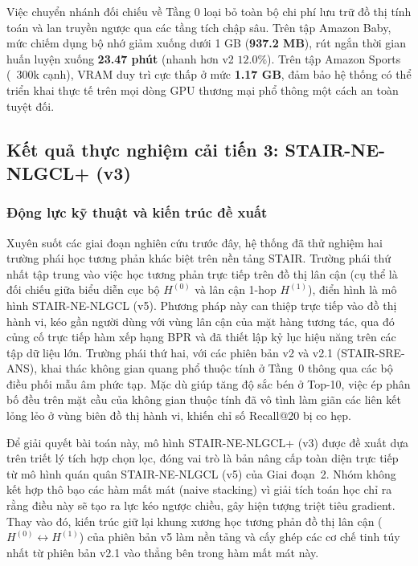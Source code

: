 Việc chuyển nhánh đối chiếu về Tầng 0 loại bỏ toàn bộ chi phí lưu trữ đồ thị tính toán và lan truyền ngược qua các tầng tích chập sâu. Trên tập Amazon Baby, mức chiếm dụng bộ nhớ giảm xuống dưới 1 GB (\textbf{937.2 MB}), rút ngắn thời gian huấn luyện xuống \textbf{23.47 phút} (nhanh hơn v2 $12.0\%$). Trên tập Amazon Sports (~300k cạnh), VRAM duy trì cực thấp ở mức \textbf{1.17 GB}, đảm bảo hệ thống có thể triển khai thực tế trên mọi dòng GPU thương mại phổ thông một cách an toàn tuyệt đối.

\subsection{Kết quả thực nghiệm cải tiến 3: STAIR-NE-NLGCL+ (v3)}

\subsubsection{Động lực kỹ thuật và kiến trúc đề xuất}

Xuyên suốt các giai đoạn nghiên cứu trước đây, hệ thống đã thử nghiệm hai trường phái học tương phản khác biệt trên nền tảng STAIR. Trường phái thứ nhất tập trung vào việc học tương phản trực tiếp trên đồ thị lân cận (cụ thể là đối chiếu giữa biểu diễn cục bộ $H^{(0)}$ và lân cận 1-hop $H^{(1)}$), điển hình là mô hình STAIR-NE-NLGCL (v5). Phương pháp này can thiệp trực tiếp vào đồ thị hành vi, kéo gần người dùng với vùng lân cận của mặt hàng tương tác, qua đó củng cố trực tiếp hàm xếp hạng BPR và đã thiết lập kỷ lục hiệu năng trên các tập dữ liệu lớn. Trường phái thứ hai, với các phiên bản v2 và v2.1 (STAIR-SRE-ANS), khai thác không gian quang phổ thuộc tính ở Tầng~0 thông qua các bộ điều phối mẫu âm phức tạp. Mặc dù giúp tăng độ sắc bén ở Top-10, việc ép phân bố đều trên mặt cầu của không gian thuộc tính đã vô tình làm giãn các liên kết lỏng lẻo ở vùng biên đồ thị hành vi, khiến chỉ số Recall@20 bị co hẹp.

Để giải quyết bài toán này, mô hình STAIR-NE-NLGCL+ (v3) được đề xuất dựa trên triết lý tích hợp chọn lọc, đóng vai trò là bản nâng cấp toàn diện trực tiếp từ mô hình quán quân STAIR-NE-NLGCL (v5) của Giai đoạn~2. Nhóm không kết hợp thô bạo các hàm mất mát (naive stacking) vì giải tích toán học chỉ ra rằng điều này sẽ tạo ra lực kéo ngược chiều, gây hiện tượng triệt tiêu gradient. Thay vào đó, kiến trúc giữ lại khung xương học tương phản đồ thị lân cận ($H^{(0)} \leftrightarrow H^{(1)}$) của phiên bản v5 làm nền tảng và cấy ghép các cơ chế tinh túy nhất từ phiên bản v2.1 vào thẳng bên trong hàm mất mát này.

